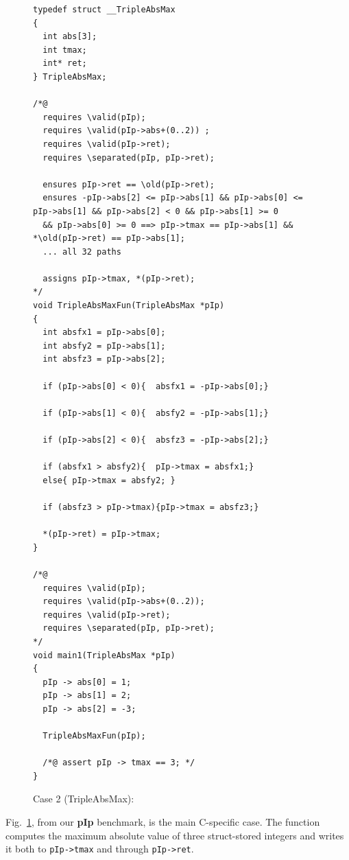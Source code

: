 \begin{figure}[!t]
    \centering
    \begin{tcolorbox}[casebox, title={\textcolor{white}{Case 2: path-complete postconditions for pointer-manipulating code}}, width=\linewidth]
\begin{lstlisting}[style=casecompactinnerstyle]
typedef struct __TripleAbsMax
{
  int abs[3];
  int tmax;
  int* ret;
} TripleAbsMax;

/*@
  requires \valid(pIp);
  requires \valid(pIp->abs+(0..2)) ;
  requires \valid(pIp->ret);
  requires \separated(pIp, pIp->ret);

  ensures pIp->ret == \old(pIp->ret);
  ensures -pIp->abs[2] <= pIp->abs[1] && pIp->abs[0] <= pIp->abs[1] && pIp->abs[2] < 0 && pIp->abs[1] >= 0
  && pIp->abs[0] >= 0 ==> pIp->tmax == pIp->abs[1] && *\old(pIp->ret) == pIp->abs[1];
  ... all 32 paths

  assigns pIp->tmax, *(pIp->ret);
*/
void TripleAbsMaxFun(TripleAbsMax *pIp)
{
  int absfx1 = pIp->abs[0];
  int absfy2 = pIp->abs[1];
  int absfz3 = pIp->abs[2];

  if (pIp->abs[0] < 0){  absfx1 = -pIp->abs[0];}

  if (pIp->abs[1] < 0){  absfy2 = -pIp->abs[1];}

  if (pIp->abs[2] < 0){  absfz3 = -pIp->abs[2];}

  if (absfx1 > absfy2){  pIp->tmax = absfx1;}
  else{ pIp->tmax = absfy2; }

  if (absfz3 > pIp->tmax){pIp->tmax = absfz3;}

  *(pIp->ret) = pIp->tmax;
}

/*@
  requires \valid(pIp);
  requires \valid(pIp->abs+(0..2));
  requires \valid(pIp->ret);
  requires \separated(pIp, pIp->ret);
*/
void main1(TripleAbsMax *pIp)
{
  pIp -> abs[0] = 1;
  pIp -> abs[1] = 2;
  pIp -> abs[2] = -3;

  TripleAbsMaxFun(pIp);

  /*@ assert pIp -> tmax == 3; */
}
\end{lstlisting}
    \end{tcolorbox}
    \caption{Case 2 (TripleAbsMax): }
    \label{fig:case3}
\end{figure}

Fig.~\ref{fig:case3}, from our \textbf{pIp} benchmark, is the main C-specific case. The function computes the maximum absolute value of three struct-stored integers and writes it both to \texttt{pIp->tmax} and through \texttt{pIp->ret}.

